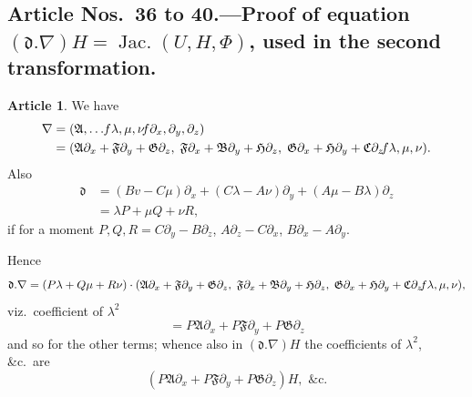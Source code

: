 \documentclass[12pt,a4paper]{article}
\theoremstyle{definition}
\newtheorem{art}{Article}[section]
\DeclareMathOperator{\Jac}{Jac.}
\begin{document}
\subsection*{Article Nos.\ 36 to 40.---Proof of equation $(\mathfrak{d}.\nabla)H = \Jac(U, H, \Phi)$, used in the second transformation.}

\begin{art}
We have
\begin{align*}
\nabla &= (\mathfrak{A}, \ldots \hspace{-2pt} f\lambda, \mu, \nu \hspace{-2pt} f\partial_x, \partial_y, \partial_z) \\
&= (\mathfrak{A}\partial_x + \mathfrak{F}\partial_y + \mathfrak{G}\partial_z, \; \mathfrak{F}\partial_x + \mathfrak{B}\partial_y + \mathfrak{H}\partial_z, \; \mathfrak{G}\partial_x + \mathfrak{H}\partial_y + \mathfrak{C}\partial_z \hspace{-2pt} f\lambda, \mu, \nu).
\end{align*}
Also
\begin{align*}
\mathfrak{d} &= (Bv - C\mu)\partial_x + (C\lambda - A\nu)\partial_y + (A\mu - B\lambda)\partial_z \\
&= \lambda P + \mu Q + \nu R,
\end{align*}
if for a moment $P, Q, R = C\partial_y - B\partial_z$, $A\partial_z - C\partial_x$, $B\partial_x - A\partial_y$.

Hence
\[
\mathfrak{d}.\nabla = (P\lambda + Q\mu + R\nu) \cdot (\mathfrak{A}\partial_x + \mathfrak{F}\partial_y + \mathfrak{G}\partial_z, \; \mathfrak{F}\partial_x + \mathfrak{B}\partial_y + \mathfrak{H}\partial_z, \; \mathfrak{G}\partial_x + \mathfrak{H}\partial_y + \mathfrak{C}\partial_z \hspace{-2pt} f\lambda, \mu, \nu),
\]
viz.\ coefficient of $\lambda^2$
\[
= P\mathfrak{A}\partial_x + P\mathfrak{F}\partial_y + P\mathfrak{G}\partial_z
\]
and so for the other terms; whence also in $(\mathfrak{d}.\nabla)H$ the coefficients of $\lambda^2$, \&c.\ are
\[
(P\mathfrak{A}\partial_x + P\mathfrak{F}\partial_y + P\mathfrak{G}\partial_z)H, \text{ \&c.}
\]
\end{art}
\end{document}
